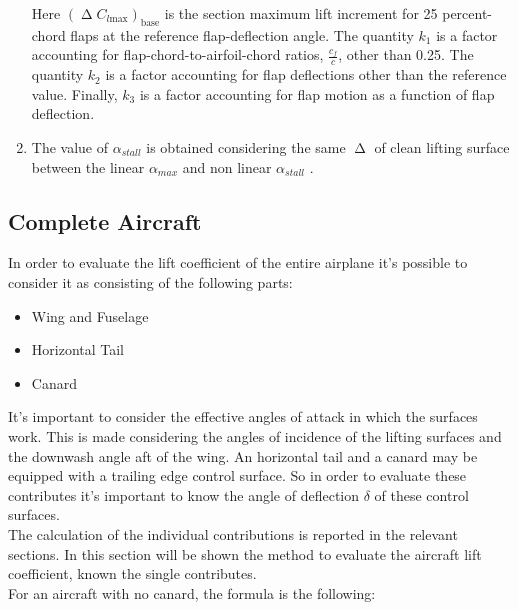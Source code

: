 \begin{enumerate}
\begin{equation}
	\end{equation}
	\noindent
	Here $\left(\upDelta C_{l\text{max}}\right)_{\text{base}}$ is the section maximum lift increment for 25 percent-chord flaps at the reference flap-deflection angle. The quantity $k_1$ is a factor accounting for flap-chord-to-airfoil-chord ratios, $\frac{c_{f}}{c}$, other than 0.25. The quantity $k_2$ is a factor accounting for flap deflections other than the reference value. Finally, $k_3$ is a factor accounting for flap motion as a function of flap deflection.
	\item The value of $\alpha_{stall}$ is obtained considering the same $\upDelta$ of clean lifting surface between the linear $\alpha_{max}$  and non linear $\alpha_{stall}$ .
\end{enumerate}




		




\subsection{Complete Aircraft}

In order to evaluate the lift coefficient of the entire airplane it's possible to consider it as consisting of the following parts\cite{ roskam2002airplane}:

\begin{itemize}
\item Wing and Fuselage
\item Horizontal Tail
\item Canard
\end{itemize}

It's important to consider the effective angles of attack in which the surfaces work. This is made considering the angles of incidence of the lifting surfaces and the downwash angle aft of the wing. An horizontal tail and a canard may be equipped with a trailing edge control surface. So in order to evaluate these contributes it's important to know the angle of deflection $\delta$ of these control surfaces.\\
The calculation of the individual contributions is reported in the relevant sections. In this section will be shown the method to evaluate the aircraft lift coefficient, known the single contributes.\\
For an aircraft with no canard, the formula is the following:

